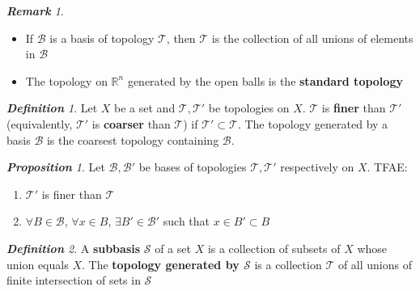 \documentclass[frenchspacing,9pt,landscape,a4paper]{article}
\newcommand{\BR}{\mathbb R}
\theoremstyle{remark}
\newtheorem*{defn}{\textbf{Definition}}
\newtheorem*{prop}{\textbf{Proposition}}
\newtheorem*{rem}{\textbf{Remark}}
\begin{document}
\begin{multicols}{4}
\begin{rem}
\begin{itemize}
    \item If $\mathcal{B}$ is a basis of topology  $\mathcal{T}$, then  $\mathcal{T}$ is the collection of
        all unions of elements in  $\mathcal{B}$
    \item The topology on  $\BR^n$ generated by the open balls is the \textbf{standard topology}
\end{itemize}    
\end{rem}
\begin{defn}
    Let $X$ be a set and  $\mathcal{T},\mathcal{T}'$ be topologies on  $X$.  $\mathcal{T}$ is
    \textbf{finer} than  $\mathcal{T}'$ (equivalently,  $\mathcal{T}'$ is \textbf{coarser} than
    $\mathcal{T}$) if  $\mathcal{T}'\subset\mathcal{T}$. The topology generated by a basis $\mathcal{B}$ is
    the coarsest topology containing  $\mathcal{B}$.
\end{defn}
\begin{prop}
    Let $\mathcal{B},\mathcal{B}'$ be bases of topologies  $\mathcal{T},\mathcal{T}'$ respectively on  $X$.
    TFAE:
     \begin{enumerate}
         \item $\mathcal{T}'$ is finer than  $\mathcal{T}$
         \item  $\forall B\in\mathcal{B}$,  $\forall x\in B$,  $\exists B'\in\mathcal{B}'$ such that  $x\in
             B'\subset B$
    \end{enumerate}
\end{prop}
\begin{defn}
    A \textbf{subbasis} $\mathcal{S}$ of a set  $X$ is a collection of subsets of  $X$ whose union equals
    $X$. The \textbf{topology generated by $\mathcal{S}$} is a collection $\mathcal{T}$ of all unions of
    finite intersection of sets in  $\mathcal{S}$
\end{defn}

\end{multicols}
\end{document}
